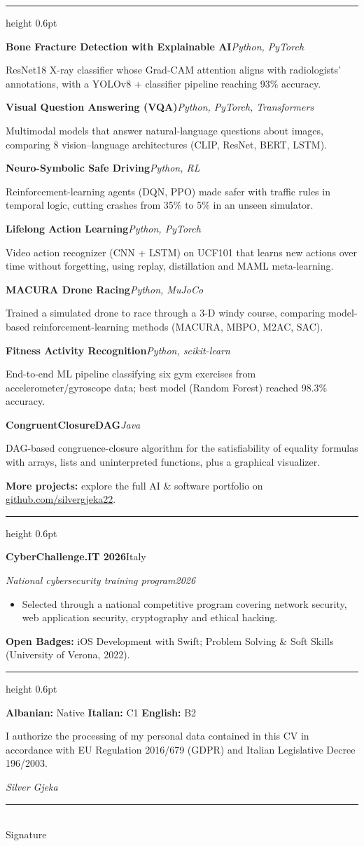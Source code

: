 \documentclass[a4paper,11pt]{article}
\newcommand{\cvsec}[1]{\vspace{7pt}{\large\scshape #1}\par\vspace{1.5pt}\hrule height 0.6pt\vspace{5pt}}
\newcommand{\cventry}[4]{\textbf{#1}\hfill #2\par\textit{#3}\hfill\textit{#4}\par\vspace{1pt}}
\newcommand{\proj}[3]{\textbf{#1}\hfill\textit{#3}\par #2\par\smallskip}
\begin{document}
\cvsec{Projects}

\proj{Bone Fracture Detection with Explainable AI}{ResNet18 X-ray classifier whose Grad-CAM attention aligns with radiologists' annotations, with a YOLOv8 + classifier pipeline reaching 93\% accuracy.}{Python, PyTorch}
\proj{Visual Question Answering (VQA)}{Multimodal models that answer natural-language questions about images, comparing 8 vision--language architectures (CLIP, ResNet, BERT, LSTM).}{Python, PyTorch, Transformers}
\proj{Neuro-Symbolic Safe Driving}{Reinforcement-learning agents (DQN, PPO) made safer with traffic rules in temporal logic, cutting crashes from 35\% to 5\% in an unseen simulator.}{Python, RL}
\proj{Lifelong Action Learning}{Video action recognizer (CNN + LSTM) on UCF101 that learns new actions over time without forgetting, using replay, distillation and MAML meta-learning.}{Python, PyTorch}
\proj{MACURA Drone Racing}{Trained a simulated drone to race through a 3-D windy course, comparing model-based reinforcement-learning methods (MACURA, MBPO, M2AC, SAC).}{Python, MuJoCo}
\proj{Fitness Activity Recognition}{End-to-end ML pipeline classifying six gym exercises from accelerometer/gyroscope data; best model (Random Forest) reached 98.3\% accuracy.}{Python, scikit-learn}
\proj{CongruentClosureDAG}{DAG-based congruence-closure algorithm for the satisfiability of equality formulas with arrays, lists and uninterpreted functions, plus a graphical visualizer.}{Java}

\textbf{More projects:} explore the full AI \& software portfolio on \href{https://github.com/silvergjeka22}{github.com/silvergjeka22}.

\cvsec{Awards \& Training}

\cventry{CyberChallenge.IT 2026}{Italy}{National cybersecurity training program}{2026}
\begin{itemize}
  \item Selected through a national competitive program covering network security, web application security, cryptography and ethical hacking.
\end{itemize}

\textbf{Open Badges:} iOS Development with Swift; Problem Solving \& Soft Skills (University of Verona, 2022).

\cvsec{Languages}

\textbf{Albanian:} Native \quad \textbf{Italian:} C1 \quad \textbf{English:} B2

\vspace{8pt}
{\footnotesize I authorize the processing of my personal data contained in this CV in accordance with EU Regulation 2016/679 (GDPR) and Italian Legislative Decree 196/2003.\par}

\vspace{18pt}
\begin{flushright}
{\itshape\Large Silver Gjeka}\\[6pt]
\rule{5.5cm}{0.4pt}\\
{\footnotesize Signature}
\end{flushright}
\end{document}

